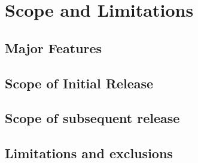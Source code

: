 \section{Scope and Limitations}
\subsection{Major Features}
\subsection{Scope of Initial Release}
\subsection{Scope of subsequent release}
\subsection{Limitations and exclusions}